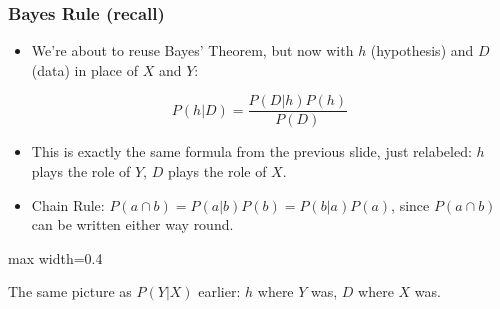 \begin{frame}[fragile]\frametitle{Bayes Rule (recall)}

\begin{itemize}
\item We're about to reuse Bayes' Theorem, but now with $h$ (hypothesis) and $D$ (data) in place of $X$ and $Y$:
\end{itemize}
\[
P(h|D) = \frac{P(D|h)P(h)}{P(D)}
\]
\begin{itemize}
\item This is exactly the same formula from the previous slide, just relabeled: $h$ plays the role of $Y$, $D$ plays the role of $X$.
\item Chain Rule: $P(a \cap b) = P(a|b)P(b) = P(b|a)P(a)$, since $P(a\cap b)$ can be written either way round.
\end{itemize}

\begin{center}
\begin{adjustbox}{max width=0.4\linewidth}
\end{adjustbox}

{\footnotesize The same picture as $P(Y|X)$ earlier: $h$ where $Y$ was, $D$ where $X$ was.}
\end{center}

\end{frame}

